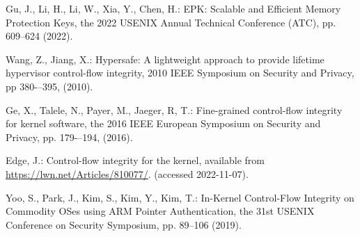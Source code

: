 \documentclass[paper]{ieice}
\begin{document}
\begin{thebibliography}{99}
  Gu, J., Li, H., Li, W., Xia, Y., Chen, H.: EPK: Scalable and Efficient Memory Protection Keys,
  the 2022 USENIX Annual Technical Conference (ATC), pp. 609--624 (2022).
  
  Wang, Z., Jiang, X.: Hypersafe: A lightweight approach to provide lifetime hypervisor control-flow integrity,
  2010 IEEE Symposium on Security and Privacy, pp 380-–395, (2010).

  Ge, X., Talele, N., Payer, M., Jaeger, R, T.: Fine-grained control-flow integrity for kernel software,
  the 2016 IEEE European Symposium on Security and Privacy, pp. 179-–194, (2016).

  Edge, J.: Control-flow integrity for the kernel, available from \url{https://lwn.net/Articles/810077/}.  (accessed 2022-11-07).

  Yoo, S., Park, J., Kim, S., Kim, Y., Kim, T.: In-Kernel Control-Flow Integrity on Commodity OSes using ARM Pointer Authentication,
  the 31st USENIX Conference on Security Symposium, pp. 89--106 (2019). 


\end{thebibliography}
\end{document}
